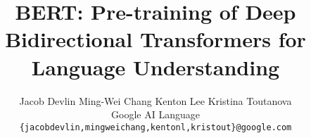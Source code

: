 \documentclass[11pt,a4paper]{article}
\title{\textbf{BERT}: Pre-training of Deep Bidirectional Transformers for \\ Language Understanding}
\author{Jacob Devlin \quad Ming-Wei Chang \quad Kenton Lee \quad Kristina Toutanova \\
  Google AI Language \\
  {\tt \{jacobdevlin,mingweichang,kentonl,kristout\}@google.com} \\}
\date{}
\begin{document}
\maketitle
\begin{abstract}
  
\end{abstract}
















{} 
\appendix                                     

\end{document}
